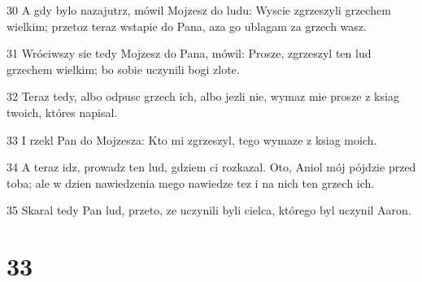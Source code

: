 \par 30 A gdy bylo nazajutrz, mówil Mojzesz do ludu: Wyscie zgrzeszyli grzechem wielkim; przetoz teraz wstapie do Pana, aza go ublagam za grzech wasz.
\par 31 Wróciwszy sie tedy Mojzesz do Pana, mówil: Prosze, zgrzeszyl ten lud grzechem wielkim; bo sobie uczynili bogi zlote.
\par 32 Teraz tedy, albo odpusc grzech ich, albo jezli nie, wymaz mie prosze z ksiag twoich, któres napisal.
\par 33 I rzekl Pan do Mojzesza: Kto mi zgrzeszyl, tego wymaze z ksiag moich.
\par 34 A teraz idz, prowadz ten lud, gdziem ci rozkazal. Oto, Aniol mój pójdzie przed toba; ale w dzien nawiedzenia mego nawiedze tez i na nich ten grzech ich.
\par 35 Skaral tedy Pan lud, przeto, ze uczynili byli cielca, którego byl uczynil Aaron.

\chapter{33}


